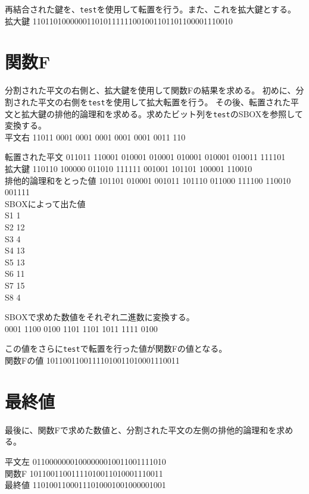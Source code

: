 \documentclass[uplatex]{jsarticle}
\begin{document}

再結合された鍵を、{\tt test}を使用して転置を行う。また、これを拡大鍵とする。\\
拡大鍵
110110100000011010111111001001101101100001110010

\section{関数F}

分割された平文の右側と、拡大鍵を使用して関数Fの結果を求める。
初めに、分割された平文の右側を{\tt test}を使用して拡大転置を行う。
その後、転置された平文と拡大鍵の排他的論理和を求める。求めたビット列を{\tt test}のSBOXを参照して変換する。\\
平文右   11011 0001 0001 0001 0001 0001 0011 110


転置された平文
011011 110001 010001 010001 010001 010001 010011 111101\\
拡大鍵
110110 100000 011010 111111 001001 101101 100001 110010\\
排他的論理和をとった値
101101 010001 001011 101110 011000 111100 110010 001111\\
SBOXによって出た値\\
S1 1\\
S2 12\\
S3 4\\
S4 13\\
S5 13\\
S6 11\\
S7 15\\
S8 4


SBOXで求めた数値をそれぞれ二進数に変換する。\\
0001 1100 0100 1101 1101 1011 1111 0100


この値をさらに{\tt test}で転置を行った値が関数Fの値となる。\\
関数Fの値
10110011001111010011010001110011

\section{最終値}
最後に、関数Fで求めた数値と、分割された平文の左側の排他的論理和を求める。


平文左
01100000001000000010011001111010\\
関数F
10110011001111010011010001110011\\
最終値
11010011000111010001001000001001\\

\end{document}
